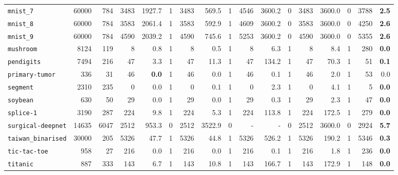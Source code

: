 \begin{tabular}{lccrrrrrrrrrrrrrr}
\texttt{mnist\_7} & \multicolumn{1}{r}{60000} & \multicolumn{1}{r}{784}  & 3483 & 1927.7 & 1 & 3483 & 569.5 & 1 & 4546 & 3600.2 & 0 & 3483 & 3600.0 & 0 & 3788 & \textbf{2.5}\\
\texttt{mnist\_8} & \multicolumn{1}{r}{60000} & \multicolumn{1}{r}{784}  & 3583 & 2061.4 & 1 & 3583 & 592.9 & 1 & 4609 & 3600.2 & 0 & 3583 & 3600.0 & 0 & 4250 & \textbf{2.6}\\
\texttt{mnist\_9} & \multicolumn{1}{r}{60000} & \multicolumn{1}{r}{784}  & 4590 & 2039.2 & 1 & 4590 & 745.6 & 1 & 5253 & 3600.2 & 0 & 4590 & 3600.0 & 0 & 5355 & \textbf{2.6}\\
\texttt{mushroom} & \multicolumn{1}{r}{8124} & \multicolumn{1}{r}{119}  & 8 & 0.8 & 1 & 8 & 0.5 & 1 & 8 & 6.3 & 1 & 8 & 8.4 & 1 & 280 & \textbf{0.0}\\
\texttt{pendigits} & \multicolumn{1}{r}{7494} & \multicolumn{1}{r}{216}  & 47 & 3.3 & 1 & 47 & 11.3 & 1 & 47 & 134.2 & 1 & 47 & 70.3 & 1 & 51 & \textbf{0.1}\\
\texttt{primary-tumor} & \multicolumn{1}{r}{336} & \multicolumn{1}{r}{31}  & 46 & \textbf{0.0} & 1 & 46 & 0.0 & 1 & 46 & 0.1 & 1 & 46 & 2.0 & 1 & 53 & 0.0\\
\texttt{segment} & \multicolumn{1}{r}{2310} & \multicolumn{1}{r}{235}  & 0 & 0.0 & 1 & 0 & 0.1 & 1 & 0 & 2.3 & 1 & 0 & 4.1 & 1 & 5 & \textbf{0.0}\\
\texttt{soybean} & \multicolumn{1}{r}{630} & \multicolumn{1}{r}{50}  & 29 & 0.0 & 1 & 29 & 0.0 & 1 & 29 & 0.3 & 1 & 29 & 2.3 & 1 & 47 & \textbf{0.0}\\
\texttt{splice-1} & \multicolumn{1}{r}{3190} & \multicolumn{1}{r}{287}  & 224 & 9.8 & 1 & 224 & 5.3 & 1 & 224 & 113.8 & 1 & 224 & 172.5 & 1 & 279 & \textbf{0.0}\\
\texttt{surgical-deepnet} & \multicolumn{1}{r}{14635} & \multicolumn{1}{r}{6047}  & 2512 & 953.3 & 0 & 2512 & 3522.9 & 0 & - & - & 0 & 2512 & 3600.0 & 0 & 2924 & \textbf{5.7}\\
\texttt{taiwan\_binarised} & \multicolumn{1}{r}{30000} & \multicolumn{1}{r}{205}  & 5326 & 47.7 & 1 & 5326 & 44.8 & 1 & 5326 & 526.2 & 1 & 5326 & 190.2 & 1 & 5346 & \textbf{0.3}\\
\texttt{tic-tac-toe} & \multicolumn{1}{r}{958} & \multicolumn{1}{r}{27}  & 216 & 0.0 & 1 & 216 & 0.0 & 1 & 216 & 0.1 & 1 & 216 & 1.8 & 1 & 236 & \textbf{0.0}\\
\texttt{titanic} & \multicolumn{1}{r}{887} & \multicolumn{1}{r}{333}  & 143 & 6.7 & 1 & 143 & 10.8 & 1 & 143 & 166.7 & 1 & 143 & 172.9 & 1 & 148 & \textbf{0.0}\\

\end{tabular}
